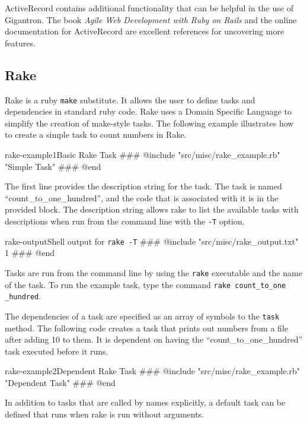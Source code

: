 \documentclass[12pt]{article}
\begin{document}
ActiveRecord contains additional functionality that can be helpful in the use of Gigantron. The book \textit{Agile Web Development with Ruby on Rails} and the online documentation for ActiveRecord are excellent references for uncovering more features.

\subsection*{Rake}

Rake is a ruby \texttt{make} substitute.  It allows the user to define tasks and dependencies in standard ruby code.  Rake uses a Domain Specific Language to simplify the creation of make-style tasks.  The following example illustrates how to create a simple task to count numbers in Rake.

\begin{code}{rake-example1}{Basic Rake Task}
### @include "src/misc/rake_example.rb" "Simple Task"
### @end
\end{code}

The first line provides the description string for the task.   The task is named ``count\_to\_one\_hundred'', and the code that is associated with it is in the provided block.  The description string allows rake to list the available tasks with descriptions when run from the command line with the \texttt{-T} option. 

\begin{code}{rake-output}{Shell output for \texttt{rake -T}}
### @include "src/misc/rake_output.txt" 1
### @end
\end{code}

Tasks are run from the command line by using the \texttt{rake} executable and the name of the task.  To run the example task, type the command \texttt{rake count\_to\_one \_hundred}. 

The dependencies of a task are specified as an array of symbols to the \texttt{task} method.  The following code creates a task that prints out numbers from a file after adding 10 to them.  It is dependent on having the ``count\_to\_one\_hundred'' task executed before it runs.

\begin{code}{rake-example2}{Dependent Rake Task}
### @include "src/misc/rake_example.rb" "Dependent Task"
### @end
\end{code}

In addition to tasks that are called by names explicitly, a default task can be defined that runs when rake is run without arguments.
\end{document}
